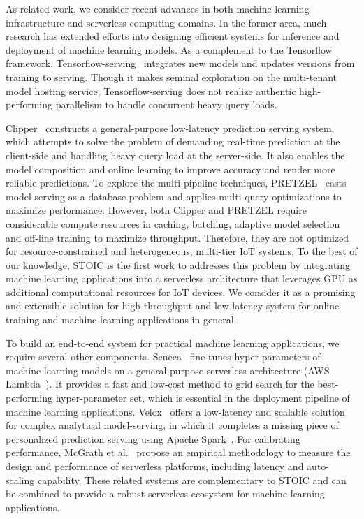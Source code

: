 As related work, we consider recent advances in both machine learning infrastructure and serverless computing domains. In the former area, much research has extended efforts into designing efficient systems for inference and deployment of machine learning models. As a complement to the Tensorflow framework, Tensorflow-serving~\cite{ref:tensorflow-serving} integrates new models and updates versions from training to serving. Though it makes seminal exploration on the multi-tenant model hosting service, Tensorflow-serving does not realize authentic high-performing parallelism to handle concurrent heavy query loads. 

Clipper~\cite{ref:clipper} constructs a general-purpose low-latency prediction serving system, which attempts to solve the problem of demanding real-time prediction at the client-side and handling heavy query load at the server-side. It also enables the model composition and online learning to improve accuracy and render more reliable predictions. To explore the multi-pipeline techniques, PRETZEL~\cite{ref:pretzel} casts model-serving as a database problem and applies multi-query optimizations to maximize performance. However, both Clipper and PRETZEL require considerable compute resources in caching, batching, adaptive model selection and off-line training to maximize throughput. Therefore, they are not optimized for resource-constrained and heterogeneous, multi-tier IoT systems. 
To the best of our knowledge, STOIC is the first work to addresses this problem by integrating machine learning applications into a serverless architecture that leverages GPU as additional computational resources for IoT devices. We consider it as a promising and extensible solution for high-throughput and low-latency system for online training and machine learning applications in general. 

 To build an end-to-end system for practical machine learning applications, we require several other components. Seneca~\cite{ref:seneca} fine-tunes hyper-parameters of machine learning models on a general-purpose serverless architecture (AWS Lambda~\cite{ref:lambda}). It provides a fast and low-cost method to grid search for the best-performing hyper-parameter set, which is essential in the deployment pipeline of machine learning applications. Velox~\cite{ref:velox} offers a low-latency and scalable solution for complex analytical model-serving, in which it completes a missing piece of personalized prediction serving using Apache Spark~\cite{ref:spark}. For calibrating performance, McGrath et al.~\cite{ref:serverless} propose an empirical methodology to measure the design and performance of serverless platforms, including latency and auto-scaling capability. These related systems are complementary to STOIC and can be combined to provide a robust serverless ecosystem for machine learning applications.
